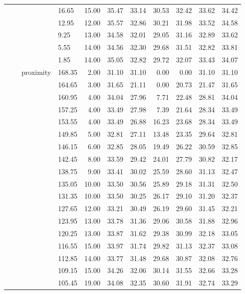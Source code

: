 \begin{longtable}{llllrrrrrrr}
   &  &  & 16.65 & 15.00 & 35.47 & 33.14 & 30.53 & 32.42 & 33.62 & 34.42 \\ 
   &  &  & 12.95 & 12.00 & 35.57 & 32.86 & 30.21 & 31.98 & 33.52 & 34.58 \\ 
   &  &  & 9.25 & 13.00 & 34.58 & 32.01 & 29.05 & 31.16 & 32.89 & 33.62 \\ 
   &  &  & 5.55 & 14.00 & 34.56 & 32.30 & 29.68 & 31.51 & 32.82 & 33.81 \\ 
   &  &  & 1.85 & 14.00 & 35.05 & 32.82 & 29.72 & 32.07 & 33.43 & 34.07 \\ 
   &  & proximity & 168.35 & 2.00 & 31.10 & 31.10 & 0.00 & 0.00 & 31.10 & 31.10 \\ 
   &  &  & 164.65 & 3.00 & 31.65 & 21.11 & 0.00 & 20.73 & 21.47 & 31.65 \\ 
   &  &  & 160.95 & 4.00 & 34.04 & 27.96 & 7.71 & 22.48 & 28.81 & 34.04 \\ 
   &  &  & 157.25 & 4.00 & 33.49 & 27.98 & 7.39 & 21.64 & 28.34 & 33.49 \\ 
   &  &  & 153.55 & 4.00 & 33.49 & 26.88 & 16.23 & 23.68 & 28.34 & 33.49 \\ 
   &  &  & 149.85 & 5.00 & 32.81 & 27.11 & 13.48 & 23.35 & 29.64 & 32.81 \\ 
   &  &  & 146.15 & 6.00 & 32.85 & 28.05 & 19.49 & 26.22 & 30.59 & 32.85 \\ 
   &  &  & 142.45 & 8.00 & 33.59 & 29.42 & 24.01 & 27.79 & 30.82 & 32.17 \\ 
   &  &  & 138.75 & 9.00 & 33.41 & 30.02 & 25.59 & 28.60 & 31.13 & 32.47 \\ 
   &  &  & 135.05 & 10.00 & 33.50 & 30.56 & 25.89 & 29.18 & 31.31 & 32.50 \\ 
   &  &  & 131.35 & 10.00 & 33.50 & 30.25 & 26.17 & 29.10 & 31.20 & 32.37 \\ 
   &  &  & 127.65 & 12.00 & 33.21 & 30.49 & 26.19 & 29.60 & 31.45 & 32.21 \\ 
   &  &  & 123.95 & 13.00 & 33.78 & 31.36 & 29.06 & 30.58 & 31.88 & 32.96 \\ 
   &  &  & 120.25 & 13.00 & 33.87 & 31.62 & 29.38 & 30.99 & 32.18 & 33.05 \\ 
   &  &  & 116.55 & 15.00 & 33.97 & 31.74 & 29.82 & 31.13 & 32.37 & 33.08 \\ 
   &  &  & 112.85 & 14.00 & 33.77 & 31.48 & 29.68 & 30.87 & 32.08 & 32.76 \\ 
   &  &  & 109.15 & 15.00 & 34.26 & 32.06 & 30.14 & 31.55 & 32.66 & 33.28 \\ 
   &  &  & 105.45 & 19.00 & 34.08 & 32.35 & 30.60 & 31.91 & 32.74 & 33.29 \\ 

\end{longtable}
